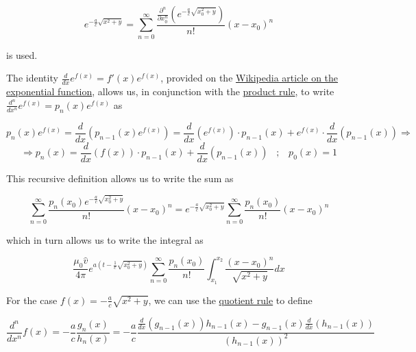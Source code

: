 ﻿\documentclass{article}
\begin{document}
\begin{equation*}
    e^{- \frac{a}{c} \sqrt{x^2 + y}} = \sum_{n = 0}^{\infty} \frac{ \frac{\partial^n}{\partial x_0^n} \left( e^{- \frac{a}{c} \sqrt{x_0^2 + y}} \right)}{n!} (x - x_0)^n
\end{equation*}

is used.

The identity $\frac{d}{dx} e^{f(x)} = f'(x) e^{f(x)}$, provided on the \href{https://en.wikipedia.org/wiki/Exponential_function}{Wikipedia article on the exponential function}, allows us, in conjunction with the \href{https://en.wikipedia.org/wiki/Product_rule}{product rule}, to write $\frac{d^n}{dx^n} e^{f(x)} = p_n(x) e^{f(x)}$ as 

\begin{equation*}
    p_n(x) e^{f(x)} = \frac{d}{dx} (p_{n - 1}(x) e^{f(x)}) = \frac{d}{dx}(e^{f(x)}) \cdot p_{n - 1}(x) + e^{f(x)} \cdot \frac{d}{dx} (p_{n - 1}(x)) \Rightarrow
\end{equation*}
\begin{equation*}
    \Rightarrow p_n(x) = \frac{d}{dx}(f(x)) \cdot p_{n - 1}(x) + \frac{d}{dx}(p_{n - 1}(x)) \hspace{10pt} ; \hspace{10pt} p_0(x) = 1
\end{equation*}

This recursive definition allows us to write the sum as

\begin{equation*}
    \sum_{n = 0}^{\infty} \frac{p_n(x_0) e^{- \frac{a}{c} \sqrt{x_0^2 + y}}}{n!} (x - x_0)^n = e^{- \frac{a}{c} \sqrt{x_0^2 + y}} \sum_{n = 0}^{\infty} \frac{p_n(x_0)}{n!} (x - x_0)^n
\end{equation*}

which in turn allows us to write the integral as

\begin{equation*}
    \frac{\mu_0 \hat{v}}{4 \pi} e^{a(t - \frac{1}{c} \sqrt{x_0^2 + y})} \sum_{n = 0}^{\infty} \frac{p_n(x_0)}{n!} \int_{x_1}^{x_2} \frac{(x - x_0)^n}{\sqrt{x^2 + y}} dx
\end{equation*}

For the case $f(x) = - \frac{a}{c} \sqrt{x^2 + y}$, we can use the \href{https://en.wikipedia.org/wiki/Quotient_rule}{quotient rule} to define

\begin{equation*}
    \frac{d^n}{dx^n} f(x) = - \frac{a}{c} \frac{g_n(x)}{h_n(x)} = - \frac{a}{c} \frac{\frac{d}{dx} (g_{n - 1}(x)) h_{n - 1}(x) - g_{n - 1}(x) \frac{d}{dx} (h_{n - 1}(x))}{(h_{n - 1}(x))^2}
\end{equation*}
\end{document}
